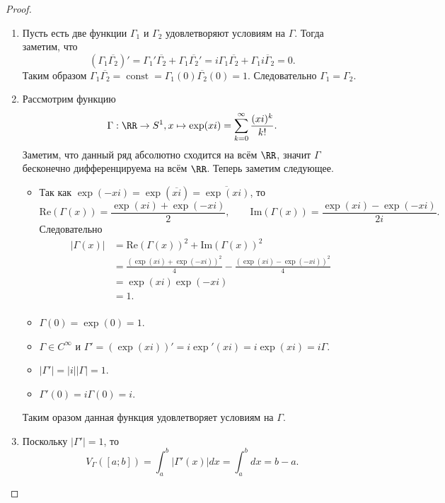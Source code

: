 \documentclass[12pt,a4paper]{article}
\DeclareMathOperator{\const}{const}
\renewcommand{\Re}{\mathrm{Re}}
\renewcommand{\Im}{\mathrm{Im}}
\begin{document}
\begin{proof}
        \begin{enumerate}
            \item Пусть есть две функции $\Gamma_1$ и $\Gamma_2$ удовлетворяют условиям на $\Gamma$. Тогда заметим, что
                \[
                    \left(\Gamma_1 \overline{\Gamma_2}\right)'
                    = \Gamma_1' \overline{\Gamma_2} + \Gamma_1 \overline{\Gamma_2}'
                    = i\Gamma_1 \overline{\Gamma_2} + \Gamma_1 \overline{i \Gamma_2}
                    = 0.
                \]
                Таким образом $\Gamma_1 \overline{\Gamma_2} = \const = \Gamma_1(0) \overline{\Gamma_2}(0) = 1$. Следовательно $\Gamma_1 = \Gamma_2$.
            \item Рассмотрим функцию
                \[\Gamma: \RR \to S^1, x \mapsto \exp(xi) = \sum_{k=0}^\infty \frac{(xi)^k}{k!}.\]
                Заметим, что данный ряд абсолютно сходится на всём $\RR$, значит $\Gamma$ бесконечно дифференцируема на всём $\RR$. Теперь заметим следующее.
                \begin{itemize}
                    \item Так как $\exp(-xi) = \exp(\overline{xi}) = \overline{\exp(xi)}$, то
                        \[\Re(\Gamma(x)) = \frac{\exp(xi) + \exp(-xi)}{2}, \qquad \Im(\Gamma(x)) = \frac{\exp(xi) - \exp(-xi)}{2i}.\]
                        Следовательно
                        \begin{align*}
                            |\Gamma(x)|
                            &= \Re(\Gamma(x))^2 + \Im(\Gamma(x))^2\\
                            &= \frac{(\exp(xi) + \exp(-xi))^2}{4} - \frac{(\exp(xi) - \exp(-xi))^2}{4}\\
                            &= \exp(xi)\exp(-xi)\\
                            &= 1.\\
                        \end{align*}
                    \item $\Gamma(0) = \exp(0) = 1$.
                    \item $\Gamma \in C^\infty$ и $\Gamma' = (\exp(xi))' = i\exp'(xi) = i \exp(xi) = i \Gamma$.
                    \item $|\Gamma'| = |i| |\Gamma| = 1$.
                    \item $\Gamma'(0) = i \Gamma(0) = i$.
                \end{itemize}
                Таким оразом данная функция удовлетворяет условиям на $\Gamma$.
            \item Поскольку $|\Gamma'| = 1$, то
                \[V_\Gamma([a; b]) = \int_a^b |\Gamma'(x)|dx = \int_a^b dx = b-a.\]
        \end{enumerate}
    \end{proof}
    
\end{document}
